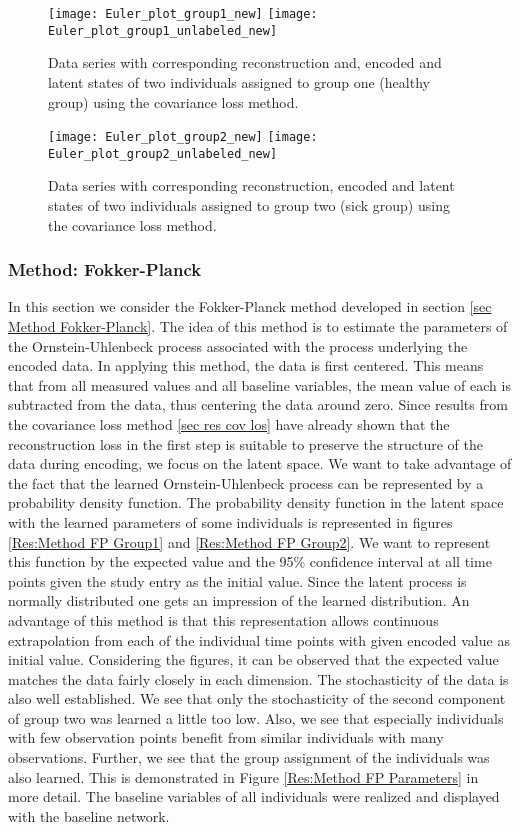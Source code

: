 \documentclass[11pt,titlepage]{article}
\theoremstyle{definition}
\theoremstyle{remark}
\begin{document}
	\begin{figure}[!h]
		\texttt{[image: Euler\_plot\_group1\_new]}
		\texttt{[image: Euler\_plot\_group1\_unlabeled\_new]}
		\caption{Data series with corresponding reconstruction and, encoded and latent states of two individuals assigned to group one (healthy group) using the covariance loss method.} \label{Res:Method Covloss Group1}
	\end{figure}
	
	\begin{figure}[!h]
		\texttt{[image: Euler\_plot\_group2\_new]}
		\texttt{[image: Euler\_plot\_group2\_unlabeled\_new]}
		\caption{Data series with corresponding reconstruction, encoded and latent states of two individuals assigned to group two (sick group) using the covariance loss method.} \label{Res:Method Covloss Group2}
	\end{figure}
	
	\clearpage
	\subsubsection{Method: Fokker-Planck}
	
	In this section we consider the Fokker-Planck method developed in section \ref{sec Method Fokker-Planck}. The idea of this method is to estimate the parameters of the Ornstein-Uhlenbeck process associated with the process underlying the encoded data. In applying this method, the data is first centered. This means that from all measured values and all baseline variables, the mean value of each is subtracted from the data, thus centering the data around zero. Since results from the covariance loss method \ref{sec res cov los} have already shown that the reconstruction loss in the first step is suitable to preserve the structure of the data during encoding, we focus on the latent space. We want to take advantage of the fact that the learned Ornstein-Uhlenbeck process can be represented by a probability density function. The probability density function in the latent space with the learned parameters of some individuals is represented in figures \ref{Res:Method FP Group1} and \ref{Res:Method FP Group2}. We want to represent this function by the expected value and the 95\% confidence interval at all time points given the study entry as the initial value. Since the latent process is normally distributed one gets an impression of the learned distribution. An advantage of this method is that this representation allows continuous extrapolation from each of the individual time points with given encoded value as initial value. Considering the figures, it can be observed that the expected value matches the data fairly closely in each dimension. The stochasticity of the data is also well established. We see that only the stochasticity of the second component of group two was learned a little too low. Also, we see that especially individuals with few observation points benefit from similar individuals with many observations. Further, we see that the group assignment of the individuals was also learned. This is demonstrated in Figure \ref{Res:Method FP Parameters} in more detail. The baseline variables of all individuals were realized and displayed with the baseline network.
	
\end{document}
